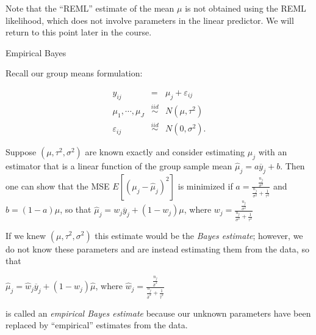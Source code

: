 \documentclass[ignorenonframetext,]{beamer}
\begin{document}
\begin{frame}{}

Note that the ``REML'' estimate of the mean \(\mu\) is not obtained
using the REML likelihood, which does not involve parameters in the
linear predictor. We will return to this point later in the course.

\end{frame}

\begin{frame}{Empirical Bayes}

Recall our group means formulation:

\begin{eqnarray*}
y_{ij}&=&\mu_j+\varepsilon_{ij}\\
\mu_1,\cdots,\mu_J &\overset{iid}{\sim}& N(\mu, \tau^2) \\
\varepsilon_{ij} &\overset{iid}{\sim} & N(0,\sigma^2).
\end{eqnarray*}

Suppose \((\mu, \tau^2, \sigma^2)\) are known exactly and consider
estimating \(\mu_j\) with an estimator that is a linear function of the
group sample mean \(\widehat{\mu}_j=a\overline{y}_j+b\). Then one can
show that the MSE \(E[(\mu_j-\widehat{\mu}_j)^2]\) is minimized if
\(a=\frac{\frac{n_j}{\sigma^2}}{\frac{n_j}{\sigma^2}+\frac{1}{\tau^2}}\)
and \(b=(1-a)\mu\), so that
\(\widehat{\mu}_j=w_j \overline{y}_j+(1-w_j)\mu\), where
\(w_j=\frac{\frac{n_j}{\sigma^2}}{\frac{n_j}{\sigma^2}+\frac{1}{\tau^2}}\)

\end{frame}

\begin{frame}{}

If we knew \((\mu, \tau^2,\sigma^2)\) this estimate would be the
\emph{Bayes estimate}; however, we do not know these parameters and are
instead estimating them from the data, so that

\(\widehat{\mu}_j=\widehat{w}_j \overline{y}_j+(1-\widehat{w}_j)\widehat{\mu}\),
where
\(\widehat{w}_j=\frac{\frac{n_j}{\widehat{\sigma}^2}}{\frac{n_j}{\widehat{\sigma}^2}+\frac{1}{\widehat{\tau}^2}}\)

is called an \emph{empirical Bayes estimate} because our unknown
parameters have been replaced by ``empirical'' estimates from the data.

\end{frame}
\end{document}
